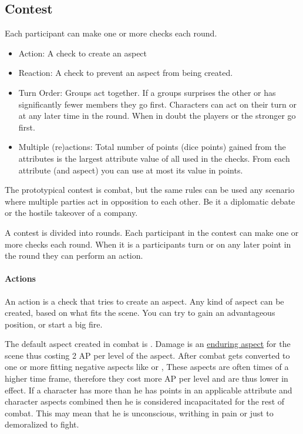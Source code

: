 \documentclass[11pt]{article}
\begin{document}
{\subsection{Contest}
\label{sec:org4446fd0}
\begin{short}
Each participant can make one or more checks each round.
\begin{itemize}
\item Action: A check to create an aspect
\item Reaction: A check to prevent an aspect from being created.
\item Turn Order: Groups act together. If a groups surprises the other or has significantly fewer members they go first. Characters can act on their turn or at any later time in the round. When in doubt the players or the stronger go first.
\item Multiple (re)actions: Total number of points (dice points) gained from the attributes is the largest attribute value of all used in the checks. From each attribute (and aspect) you can use at most its value in points.
\end{itemize}
\end{short}

The prototypical contest is combat, but the same rules can be used any scenario where multiple parties act in opposition to each other. Be it a diplomatic debate or the hostile takeover of a company. 

A contest is divided into rounds. Each participant in the contest can make one or more checks each round. When it is a participants turn or on any later point in the round they can perform an action.
\paragraph*{Actions}
\label{sec:org82b763b}
An action is a check that tries to create an aspect. Any kind of aspect can be created, based on what fits the scene. You can try to gain an advantageous position, or start a big fire.

The default aspect created in combat is . Damage is an \hyperref[sec:orgd4ba133]{enduring aspect} for the scene thus costing 2 AP per level of the aspect. After combat  gets converted to one or more fitting negative aspects like  or , These aspects are often times of a higher time frame, therefore they cost more AP per level and are thus lower in effect.
If a character has more  than he has points in an applicable attribute and character aspects combined then he is considered incapacitated for the rest of combat. This may mean that he is unconscious, writhing in pain or just to demoralized to fight.

}
\end{document}
